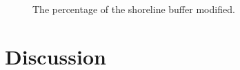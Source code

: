 \documentclass[12pt]{article}\usepackage[]{graphicx}\usepackage[]{color}
\begin{document}
\begin{figure}[H]

{\centering {} 

}

\caption{The percentage of the shoreline buffer modified.}\label{fig:percentmod}
\end{figure}
\hypertarget{discussion}{%
\section{Discussion}\label{discussion}}
\end{document}
